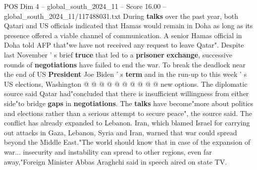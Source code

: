 \begin{textsample}{POS Dim 4 – global\_south\_2024\_11 – Score 16.00 – global\_south\_2024\_11/117488031.txt}
During \textbf{talks} over the past year, both Qatari and US officials indicated that Hamas would remain in Doha as long as its presence offered a viable channel of communication.
A senior Hamas official in Doha told AFP that"we have not received any request to leave Qatar".
Despite last November ' s brief \textbf{truce} that led to a \textbf{prisoner} \textbf{exchange}, successive rounds of \textbf{negotiations} have failed to end the war.
To break the deadlock near the end of US \textbf{President} Joe Biden ' s \textbf{term} and in the run-up to this week ' s US elections, Washington @ @ @ @ @ @ @ @ @ @ new options.
The diplomatic source said Qatar had"concluded that there is insufficient willingness from either side"to bridge \textbf{gaps} in \textbf{negotiations}.
The \textbf{talks} have become"more about politics and elections rather than a serious attempt to secure peace", the source said.
The conflict has already expanded to Lebanon.
Iran, which blamed Israel for carrying out attacks in Gaza, Lebanon, Syria and Iran, warned that war could spread beyond the Middle East."The world should know that in case of the expansion of war... insecurity and instability can spread to other regions, even far away,"Foreign Minister Abbas Araghchi said in speech aired on state TV.

\end{textsample}
